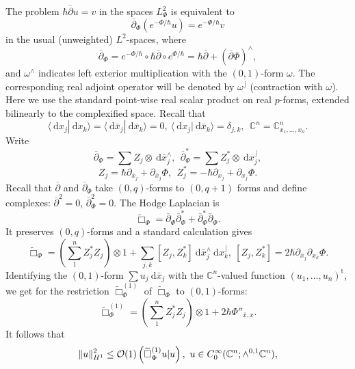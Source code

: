 \documentclass{article}
\newcommand{\DD}{\:\!\mathrm{d}}
\newcommand{\CM}{\mathbb{C}}
\newcommand{\h}{\hbar}
\newcommand{\pscal}[2]{\left(#1 | #2\right)}
\begin{document}
The problem $\h\overline{\partial }u=v$ in the spaces $L^2_\Phi $ is
equivalent to
\begin{equation}\label{dbar.3}
  \overline{\partial }_\Phi (e^{-\Phi/\h }u) = e^{-\Phi /\h} v
\end{equation}
in the usual (unweighted) $L^2$-spaces, where
\[
\overline{\partial }_\Phi =e^{-\Phi /\h }\circ \h
\overline{\partial}\circ e^{\Phi /\h }= \h \overline{\partial } +
(\overline{\partial }\Phi)^\wedge ,
\]
and $\omega ^\wedge$ indicates left exterior multiplication with the
$(0,1)$-form $\omega $. The corresponding real adjoint operator will
be denoted by $\omega ^\rfloor$ (contraction with $\omega $). Here we
use the standard point-wise real scalar product on real $p$-forms,
extended bilinearly to the complexified space. Recall that
\[
\langle \DD x_j|\DD x_k\rangle = \langle
\DD\bar{x}_j|\DD\bar{x}_k\rangle=0,\ \langle \DD
x_j|\DD\bar{x}_k\rangle=\delta _{j,k},\ \ \CM^n=\CM^n_{x_1,\dots,x_n}.
\]
Write
\[
\overline{\partial }_\Phi = \sum Z_j\otimes\DD \bar{x}_j^\wedge, \ \
\overline{\partial }^*_\Phi =\sum Z_j^*\otimes \DD x_j^\rfloor,
\]
\[
Z_j=\h \partial _{\bar{x}_j}+\partial _{\bar{x}_j}\Phi ,\ \
Z_j^*=-\h \partial _{x_j}+\partial _{x_j}\Phi .
\]
Recall that $\overline{\partial }$ and $\overline{\partial }_\Phi $
take $(0,q)$-forms to $(0,q+1)$ forms and define complexes:
$\overline{\partial }^2=0$, $\overline{\partial }_\Phi ^2=0$. The
Hodge Laplacian is
\[
\widetilde{\Box}_\Phi =\overline{\partial }_\Phi \overline{\partial
}^*_\Phi + \overline{\partial }^*_\Phi \overline{\partial }_\Phi.
\]
It preserves $(0,q)$-forms and a standard calculation gives
\begin{equation}\label{dbar.4}
  \widetilde{\Box}_\Phi  =\left( \sum_1^n Z_j^*Z_j \right)\otimes
  1+\sum_{j,k}[Z_j,Z_k^*]\DD\bar{x}_j^\wedge \DD x_k^\rfloor,\
  [Z_j,Z_k^*]=2\h \partial _{\bar{x}_j}\partial _{x_k}\Phi .
\end{equation}
Identifying the $(0,1)$-form $\sum u_j\DD\bar{x}_j$ with the
$\CM^n$-valued function $(u_1,\dots,u_n)^\mathrm{t}$, we get for the
restriction $\widetilde{\Box}^{(1)}_\Phi $ of $\widetilde{\Box}_\Phi $
to $(0,1)$-forms:
\begin{equation}\label{dbar.5}
  \widetilde{\Box}^{(1)}_\Phi =\left( \sum_1^n Z_j^*Z_j \right)\otimes
  1+2\h \Phi ''_{\bar{x},x}.
\end{equation} It follows that 
\begin{equation}\label{dbar.6}
  \| u\|_{H^1}^2\le {\cal O}(1) \pscal{\widetilde{\Box}^{(1)}_\Phi u}{u},\ u\in C_0^\infty
  (\CM^n;\wedge ^{0,1}\CM^{n}),
\end{equation}
\end{document}
